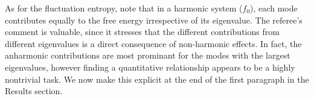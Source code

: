 \documentclass[12pt,article]{iopart}
\begin{document}
As for the fluctuation entropy, note that in a harmonic system
($f_0$), each mode contributes equally to the free energy irrespective
of its eigenvalue. The referee's comment is valuable, since it
stresses that the different contributions from different eigenvalues
is a direct consequence of non-harmonic effects. In fact, the
anharmonic contributions are most prominant for the modes with the
largest eigenvalues, however finding a quantitative relationship
appears to be a highly nontrivial task. We now make this explicit at
the end of the first paragraph in the Results section.
\end{document}
